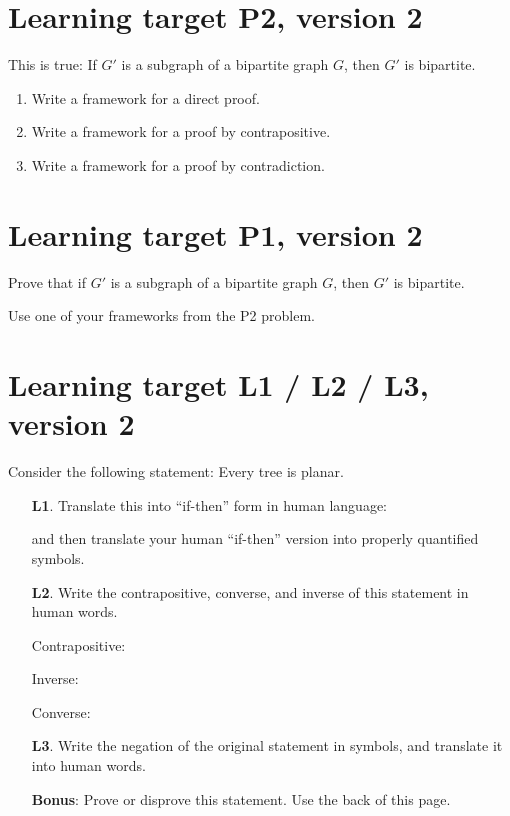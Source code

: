 \pagebreak
\section{Learning target P2, version 2}
This is true: If $G'$ is a subgraph of a bipartite graph $G$, then $G'$ is bipartite.
\begin{enumerate}[leftmargin=0pt]
    \item Write a framework for a direct proof.
    \vfill
    \item Write a framework for a proof by contrapositive.
    \vfill
    \item Write a framework for a proof by contradiction.
    \vfill
\end{enumerate}

\pagebreak
\section{Learning target P1, version 2}
Prove that if $G'$ is a subgraph of a bipartite graph $G$, then $G'$ is bipartite.

Use one of your frameworks from the P2 problem.

\pagebreak
\section{Learning target L1 / L2 / L3, version 2}
Consider the following statement: Every tree is planar.
\begin{enumerate}
    \item[\textbf{L1}.] Translate this into ``if-then'' form in human language:

    \vspace{2cm}
    and then translate your human ``if-then'' version into properly quantified symbols.

    \vspace{2cm}
    \item[\textbf{L2}.] Write the contrapositive, converse, and inverse of this statement in human words.

    Contrapositive:

    \vspace{2cm}
    Inverse:

    \vspace{2cm}
    Converse:

    \vspace{2cm}
    \item[\textbf{L3}.] Write the negation of the original statement in symbols, and translate it into human words.
    
    \vfill
    \item[\textbf{Bonus}:] Prove or disprove this statement. Use the back of this page.
\end{enumerate}

